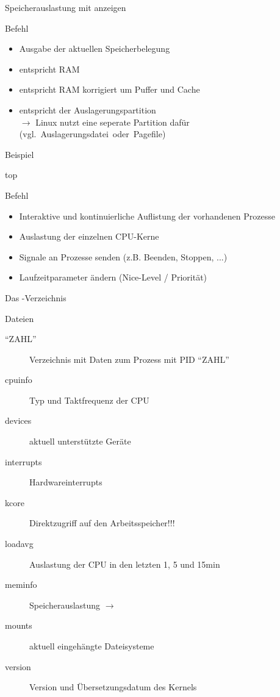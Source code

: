 \documentclass[aspectratio=43]{beamer}
\begin{document}
\begin{frame}{Speicherauslastung mit  anzeigen}
  \begin{block}{Befehl }
    \begin{itemize}
      \item Ausgabe der aktuellen Speicherbelegung
      \item {} entspricht RAM
      \item \co{-/+} entspricht RAM korrigiert um Puffer und Cache
      \item {} entspricht der Auslagerungspartition \\
            $\rightarrow$ Linux nutzt eine seperate Partition dafür
            (vgl.~Auslagerungsdatei~oder~Pagefile)
    \end{itemize}
  \end{block}
  \begin{exampleblock}{Beispiel}
  \end{exampleblock}
\end{frame}

\begin{frame}{top}
  \begin{block}{Befehl }
    \begin{itemize}
      \item Interaktive und kontinuierliche Auflistung der vorhandenen Prozesse
      \item Auslastung der einzelnen CPU-Kerne
      \item Signale an Prozesse senden (z.B. Beenden, Stoppen, ...)
      \item Laufzeitparameter ändern (Nice-Level / Priorität)
    \end{itemize}
  \end{block}
\end{frame}

\begin{frame}{Das -Verzeichnis}
  \begin{block}{Dateien}
    \begin{description}
      \item[``ZAHL''] Verzeichnis mit Daten zum Prozess mit PID ``ZAHL''
      \item[cpuinfo] Typ und Taktfrequenz der CPU
      \item[devices] aktuell unterstützte Geräte
      \item[interrupts] Hardwareinterrupts
      \item[kcore]   Direktzugriff auf den Arbeitsspeicher!!!
      \item[loadavg] Auslastung der CPU in den letzten 1, 5 und 15min
      \item[meminfo] Speicherauslastung $\rightarrow$ 
      \item[mounts]  aktuell eingehängte Dateisysteme
      \item[version] Version und Übersetzungsdatum des Kernels
    \end{description}
  \end{block}
\end{frame}
\end{document}
